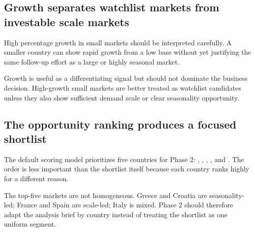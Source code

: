 \subsection{Growth separates watchlist markets from investable scale markets}

High percentage growth in small markets should be interpreted carefully. A smaller country can show rapid growth from a low base without yet justifying the same follow-up effort as a large or highly seasonal market.

\begin{finding}
Growth is useful as a differentiating signal but should not dominate the business decision. High-growth small markets are better treated as watchlist candidates unless they also show sufficient demand scale or clear seasonality opportunity.
\end{finding}


\subsection{The opportunity ranking produces a focused shortlist}

The default scoring model prioritizes five countries for Phase 2: , , , , and . The order is less important than the shortlist itself because each country ranks highly for a different reason.



\begin{finding}
The top-five markets are not homogeneous. Greece and Croatia are seasonality-led; France and Spain are scale-led; Italy is mixed. Phase 2 should therefore adapt the analysis brief by country instead of treating the shortlist as one uniform segment.
\end{finding}
